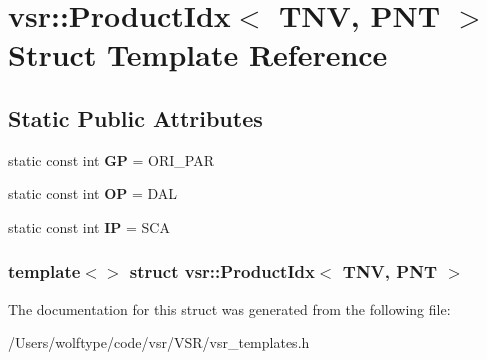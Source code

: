 \hypertarget{structvsr_1_1_product_idx_3_01_t_n_v_00_01_p_n_t_01_4}{\section{vsr\-:\-:Product\-Idx$<$ T\-N\-V, P\-N\-T $>$ Struct Template Reference}
\label{structvsr_1_1_product_idx_3_01_t_n_v_00_01_p_n_t_01_4}
}
\subsection*{Static Public Attributes}
\begin{DoxyCompactItemize}
\item 
\hypertarget{structvsr_1_1_product_idx_3_01_t_n_v_00_01_p_n_t_01_4_ab1ad2d14ae5f3c13fede0fe42a979cbf}{static const int {\bfseries G\-P} = O\-R\-I\-\_\-\-P\-A\-R}\label{structvsr_1_1_product_idx_3_01_t_n_v_00_01_p_n_t_01_4_ab1ad2d14ae5f3c13fede0fe42a979cbf}

\item 
\hypertarget{structvsr_1_1_product_idx_3_01_t_n_v_00_01_p_n_t_01_4_ae3a07fa2cce3f6a25fc8dbbc95465f11}{static const int {\bfseries O\-P} = D\-A\-L}\label{structvsr_1_1_product_idx_3_01_t_n_v_00_01_p_n_t_01_4_ae3a07fa2cce3f6a25fc8dbbc95465f11}

\item 
\hypertarget{structvsr_1_1_product_idx_3_01_t_n_v_00_01_p_n_t_01_4_a70d70360733c45edadcbb9257d4948d3}{static const int {\bfseries I\-P} = S\-C\-A}\label{structvsr_1_1_product_idx_3_01_t_n_v_00_01_p_n_t_01_4_a70d70360733c45edadcbb9257d4948d3}

\end{DoxyCompactItemize}
\subsubsection*{template$<$$>$ struct vsr\-::\-Product\-Idx$<$ T\-N\-V, P\-N\-T $>$}



The documentation for this struct was generated from the following file\-:\begin{DoxyCompactItemize}
\item 
/\-Users/wolftype/code/vsr/\-V\-S\-R/vsr\-\_\-templates.\-h\end{DoxyCompactItemize}

